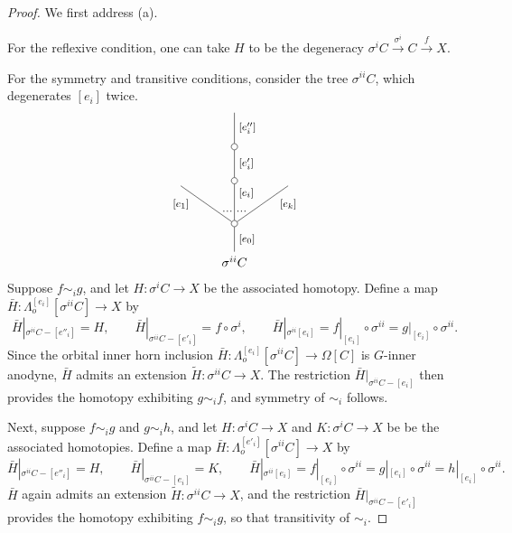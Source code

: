 \documentclass[a4paper,10pt
,draft
]{article}%
\renewcommand{\1}{\eta}%
\begin{document}
\begin{proof}
	We first address (a). 
	
	For the reflexive condition, one can take $H$ to be the degeneracy
	$\sigma^i C \xrightarrow{\sigma^i} C \xrightarrow{f} X$.
	
	For the symmetry and transitive conditions, consider the tree
	$\sigma^{ii} C$, which degenerates $[e_i]$ twice.
\[
\begin{tikzpicture}
[grow=up,auto,level distance=3em,
every node/.style = {font=\footnotesize},
dummy/.style={circle,draw,inner sep=0pt,minimum size=1.75mm}]
	\node at (0,0) [font=\normalsize]{$\sigma^{ii} C$}
		child{node [dummy] {}
			child{
			edge from parent node [swap,near end] {$[e_k]$} node [near start,inner sep=1pt,name=Kn] {}}
			child[level distance=3.4em]{node [dummy] {}
				child[level distance=2.7em]{node [dummy] {}
					child[level distance=2.7em]{
					edge from parent node [swap] {$[e''_i]$}
}
				edge from parent node [swap] {$[e'_i]$}
}
			edge from parent node [near end,swap] {$[e_i]$}
node [near start,inner sep=1pt,name=Kone,swap] {}
node [near start,inner sep=1pt,name=Kone1] {}}
			child{
			edge from parent node [near end] {$[e_1]$}
node [swap] {}
node [near start,inner sep=1pt,name=Kn1,swap]{}}
		edge from parent node [swap] {$[e_0]$}
		};
		\draw [dotted,thick] (Kone) -- (Kn) ;
		\draw [dotted,thick] (Kone1) -- (Kn1) ;
\end{tikzpicture}
\]
Suppose $f \sim_i g$, and let 
$H \colon \sigma^{i} C \to X$ be the associated homotopy.
Define a map 
$\bar{H} \colon \Lambda^{[e_i]}_o[\sigma^{ii} C] \to X$ by
\[
	\bar{H}|_{\sigma^{ii}C - [e''_i]} = H,
		\qquad
	\bar{H}|_{\sigma^{ii}C - [e'_i]} = f \circ \sigma^i,
		\qquad
	\bar{H}|_{\sigma^{ii} [e_i]} = 
	f|_{[e_i]} \circ \sigma^{ii} =
	g|_{[e_i]} \circ \sigma^{ii}.
\]
Since the orbital inner horn inclusion
$\bar{H} \colon \Lambda^{[e_i]}_o[\sigma^{ii} C] \to \Omega[C]$
is $G$-inner anodyne,
$\bar{H}$ admits an extension $\widetilde{H} \colon \sigma^{ii}C \to X$.
The restriction $\bar{H}|_{\sigma^{ii}C - [e_i]}$ then provides the homotopy exhibiting $g \sim_i f$, and symmetry of $\sim_i$ follows.

Next, suppose $f \sim_i g$ and $g \sim_i h$, and let 
$H \colon \sigma^{i} C \to X$ and
$K \colon \sigma^{i} C \to X$ be be the associated homotopies.
Define a map 
$\bar{H} \colon \Lambda^{[e'_i]}_o[\sigma^{ii} C] \to X$ by
\[
	\bar{H}|_{\sigma^{ii}C - [e''_i]} = H,
		\qquad
	\bar{H}|_{\sigma^{ii}C - [e_i]} = K,
		\qquad
	\bar{H}|_{\sigma^{ii} [e_i]} = 
	f|_{[e_i]} \circ \sigma^{ii} =
	g|_{[e_i]} \circ \sigma^{ii} =
	h|_{[e_i]} \circ \sigma^{ii}.
\]
$\bar{H}$ again admits an extension $\widetilde{H} \colon \sigma^{ii}C \to X$, and the restriction $\bar{H}|_{\sigma^{ii}C - [e'_i]}$
provides the homotopy exhibiting $f \sim_i g$, so that transitivity of $\sim_i$.


\end{proof}
\end{document}
